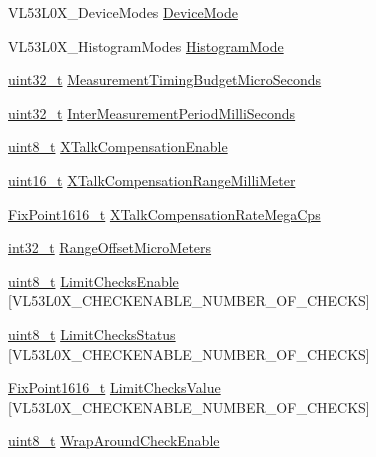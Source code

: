 \begin{DoxyCompactItemize}
\item 
V\+L53\+L0\+X\+\_\+\+Device\+Modes \hyperlink{structVL53L0X__DeviceParameters__t_a0514eef31cf380fcd88e6b49c7d67e0e}{Device\+Mode}
\item 
V\+L53\+L0\+X\+\_\+\+Histogram\+Modes \hyperlink{structVL53L0X__DeviceParameters__t_a748936fcbb276810d7ba8ac7310558df}{Histogram\+Mode}
\item 
\hyperlink{vl53l0x__types_8h_a435d1572bf3f880d55459d9805097f62}{uint32\+\_\+t} \hyperlink{structVL53L0X__DeviceParameters__t_a424c2649ca5ee37e35d0bdb238563283}{Measurement\+Timing\+Budget\+Micro\+Seconds}
\item 
\hyperlink{vl53l0x__types_8h_a435d1572bf3f880d55459d9805097f62}{uint32\+\_\+t} \hyperlink{structVL53L0X__DeviceParameters__t_a3581f54be842eeb9ae58d7581af4ee49}{Inter\+Measurement\+Period\+Milli\+Seconds}
\item 
\hyperlink{vl53l0x__types_8h_aba7bc1797add20fe3efdf37ced1182c5}{uint8\+\_\+t} \hyperlink{structVL53L0X__DeviceParameters__t_a351270eb4433acb1a19a237799d4d348}{X\+Talk\+Compensation\+Enable}
\item 
\hyperlink{vl53l0x__types_8h_a273cf69d639a59973b6019625df33e30}{uint16\+\_\+t} \hyperlink{structVL53L0X__DeviceParameters__t_aeca6ac7d3a5c70cae7ae911865e57949}{X\+Talk\+Compensation\+Range\+Milli\+Meter}
\item 
\hyperlink{vl53l0x__types_8h_afb910790161809fc76e1a274a6349384}{Fix\+Point1616\+\_\+t} \hyperlink{structVL53L0X__DeviceParameters__t_a60744d01901d1ff8ffe1145b33f86815}{X\+Talk\+Compensation\+Rate\+Mega\+Cps}
\item 
\hyperlink{vl53l0x__types_8h_a32f2e37ee053cf2ce8ca28d1f74630e5}{int32\+\_\+t} \hyperlink{structVL53L0X__DeviceParameters__t_a2ee18193089579c1006843ca272f3e36}{Range\+Offset\+Micro\+Meters}
\item 
\hyperlink{vl53l0x__types_8h_aba7bc1797add20fe3efdf37ced1182c5}{uint8\+\_\+t} \hyperlink{structVL53L0X__DeviceParameters__t_a2e98f29647c0d6eef03ab816fb563334}{Limit\+Checks\+Enable} \mbox{[}V\+L53\+L0\+X\+\_\+\+C\+H\+E\+C\+K\+E\+N\+A\+B\+L\+E\+\_\+\+N\+U\+M\+B\+E\+R\+\_\+\+O\+F\+\_\+\+C\+H\+E\+C\+KS\mbox{]}
\item 
\hyperlink{vl53l0x__types_8h_aba7bc1797add20fe3efdf37ced1182c5}{uint8\+\_\+t} \hyperlink{structVL53L0X__DeviceParameters__t_adc836ef0c21accb4957b11cdd662483b}{Limit\+Checks\+Status} \mbox{[}V\+L53\+L0\+X\+\_\+\+C\+H\+E\+C\+K\+E\+N\+A\+B\+L\+E\+\_\+\+N\+U\+M\+B\+E\+R\+\_\+\+O\+F\+\_\+\+C\+H\+E\+C\+KS\mbox{]}
\item 
\hyperlink{vl53l0x__types_8h_afb910790161809fc76e1a274a6349384}{Fix\+Point1616\+\_\+t} \hyperlink{structVL53L0X__DeviceParameters__t_a6d87c1a55d8c1097571782aecf30da5c}{Limit\+Checks\+Value} \mbox{[}V\+L53\+L0\+X\+\_\+\+C\+H\+E\+C\+K\+E\+N\+A\+B\+L\+E\+\_\+\+N\+U\+M\+B\+E\+R\+\_\+\+O\+F\+\_\+\+C\+H\+E\+C\+KS\mbox{]}
\item 
\hyperlink{vl53l0x__types_8h_aba7bc1797add20fe3efdf37ced1182c5}{uint8\+\_\+t} \hyperlink{structVL53L0X__DeviceParameters__t_aa983c0dac546f4ffbe16f019149f6a62}{Wrap\+Around\+Check\+Enable}
\end{DoxyCompactItemize}


